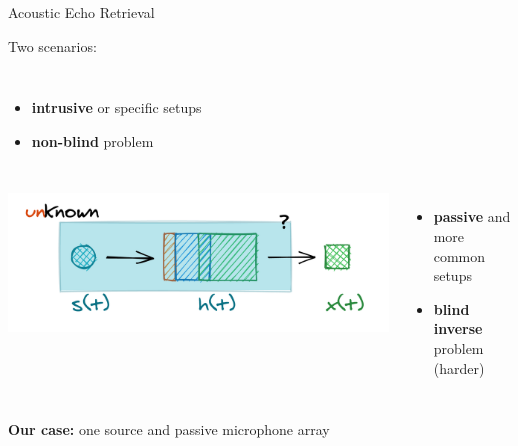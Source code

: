 \begin{frame}[t]{Acoustic Echo Retrieval \hfill\faBook}
\begin{block}{Two scenarios:}
\begin{columns}[onlytextwidth]
        \begin{itemize}
            \small
            \item[\faVolumeUp] \textbf{intrusive} or specific setups
            \item[\faEye] \textbf{non-blind} problem
            \\
        \end{itemize}
    \end{columns}
    \end{block}

    \pause

    \begin{mycontriblock}
        \begin{columns}[onlytextwidth]

        \centering
        \includegraphics[width=.9\textwidth]{./figures/passive.png}

        \begin{itemize}
            \small
            \item[\faMicrophone] \textbf{passive} and more common setups
            \item[\faEyeSlash] \textbf{blind inverse} problem (harder)
            \\
        \end{itemize}
    \end{columns}
    \end{mycontriblock}

    \pause
    \begin{center}
        \textcolor{myred}{\textbf{Our case:} one source and passive microphone array}
    \end{center}

\end{frame}

